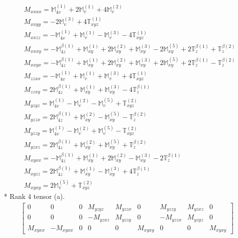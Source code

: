 \documentclass[fleqn,8pt,landscape]{jsarticle}
\begin{document}
\begin{align*}
& M_{xxxx} = \mathbb{M}_{4v}^{(1)} + 2 \mathbb{M}_{v}^{(1)} + 4 \mathbb{M}_{v}^{(2)} \\
& M_{xxyy} = - 2 \mathbb{M}_{v}^{(3)} + 4 \mathbb{T}_{xyz}^{(1)} \\
& M_{xxzz} = - \mathbb{M}_{4v}^{(1)} + \mathbb{M}_{v}^{(1)} - \mathbb{M}_{v}^{(3)} - 4 \mathbb{T}_{xyz}^{(1)} \\
& M_{xxxy} = - \mathbb{M}_{4z}^{\beta(1)} + \mathbb{M}_{xy}^{(1)} + 2 \mathbb{M}_{xy}^{(2)} + \mathbb{M}_{xy}^{(3)} - 2 \mathbb{M}_{xy}^{(5)} + 2 \mathbb{T}_{z}^{\beta(1)} + \mathbb{T}_{z}^{\beta(2)} \\
& M_{xxyx} = - \mathbb{M}_{4z}^{\beta(1)} + \mathbb{M}_{xy}^{(1)} + 2 \mathbb{M}_{xy}^{(2)} + \mathbb{M}_{xy}^{(3)} + 2 \mathbb{M}_{xy}^{(5)} + 2 \mathbb{T}_{z}^{\beta(1)} - \mathbb{T}_{z}^{\beta(2)} \\
& M_{zzxx} = - \mathbb{M}_{4v}^{(1)} + \mathbb{M}_{v}^{(1)} + \mathbb{M}_{v}^{(3)} + 4 \mathbb{T}_{xyz}^{(1)} \\
& M_{zzxy} = 2 \mathbb{M}_{4z}^{\beta(1)} + \mathbb{M}_{xy}^{(1)} + \mathbb{M}_{xy}^{(3)} - 4 \mathbb{T}_{z}^{\beta(1)} \\
& M_{yzyz} = \mathbb{M}_{4v}^{(1)} - \mathbb{M}_{v}^{(2)} - \mathbb{M}_{v}^{(5)} + \mathbb{T}_{xyz}^{(2)} \\
& M_{yzzx} = 2 \mathbb{M}_{4z}^{\beta(1)} + \mathbb{M}_{xy}^{(2)} - \mathbb{M}_{xy}^{(5)} - \mathbb{T}_{z}^{\beta(2)} \\
& M_{yzzy} = \mathbb{M}_{4v}^{(1)} - \mathbb{M}_{v}^{(2)} + \mathbb{M}_{v}^{(5)} - \mathbb{T}_{xyz}^{(2)} \\
& M_{yzxz} = 2 \mathbb{M}_{4z}^{\beta(1)} + \mathbb{M}_{xy}^{(2)} + \mathbb{M}_{xy}^{(5)} + \mathbb{T}_{z}^{\beta(2)} \\
& M_{xyxx} = - \mathbb{M}_{4z}^{\beta(1)} + \mathbb{M}_{xy}^{(1)} + 2 \mathbb{M}_{xy}^{(2)} - \mathbb{M}_{xy}^{(3)} - 2 \mathbb{T}_{z}^{\beta(1)} \\
& M_{xyzz} = 2 \mathbb{M}_{4z}^{\beta(1)} + \mathbb{M}_{xy}^{(1)} - \mathbb{M}_{xy}^{(3)} + 4 \mathbb{T}_{z}^{\beta(1)} \\
& M_{xyxy} = 2 \mathbb{M}_{v}^{(5)} + \mathbb{T}_{xyz}^{(2)}
\end{align*}
* Rank 4 tensor (a).
\begin{align*}
\begin{bmatrix} 0 & 0 & 0 & M_{yzyz} & M_{yzzx} & 0 & M_{yzzy} & M_{yzxz} & 0 \\ 0 & 0 & 0 & - M_{yzxz} & M_{yzzy} & 0 & - M_{yzzx} & M_{yzyz} & 0 \\ M_{xyxx} & - M_{xyxx} & 0 & 0 & 0 & M_{xyxy} & 0 & 0 & M_{xyxy} \end{bmatrix}
\end{align*}
\end{document}
